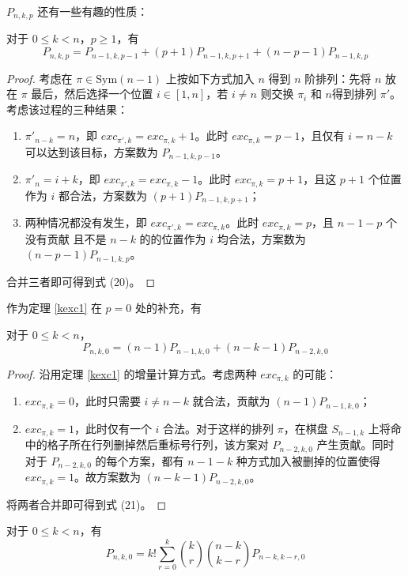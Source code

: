 \documentclass{noithesis}
\begin{document}
	$P_{n,k,p}$ 还有一些有趣的性质：
	\begin{theorem}\label{kexc1}
		对于 $0 \leq k < n$，$p \geq 1$，有
		\begin{equation}
		P_{n,k,p} = P_{n-1,k,p-1} + (p+1)P_{n-1,k,p+1}+(n-p-1)P_{n-1,k,p}
		\end{equation}
	\end{theorem}
	\begin{proof}
		考虑在 $\pi \in \mathrm{Sym}(n-1)$ 上按如下方式加入 $n$ 得到 $n$ 阶排列：先将 $n$ 放在 $\pi$ 最后，然后选择一个位置 $i \in [1,n]$，若 $i \neq n$ 则交换 $\pi_i$ 和 $n$得到排列 $\pi'$。考虑该过程的三种结果：
		\begin{enumerate}
			\item $\pi'_{n-k} = n$，即 $exc_{\pi',k} = exc_{\pi,k}+1$。此时 $exc_{\pi,k} = p-1$，且仅有 $i=n-k$ 可以达到该目标，方案数为 $P_{n-1,k,p-1}$。
			\item $\pi'_{n} = i+k$，即 $exc_{\pi',k} = exc_{\pi,k}-1$。此时 $exc_{\pi,k} = p+1$，且这 $p+1$ 个位置作为 $i$ 都合法，方案数为 $(p+1)P_{n-1,k,p+1}$；
			\item 两种情况都没有发生，即 $exc_{\pi',k} = exc_{\pi,k}$。此时 $exc_{\pi,k} = p$，且 $n-1-p$ 个没有贡献 且不是 $n-k$ 的的位置作为 $i$ 均合法，方案数为 $(n-p-1)P_{n-1,k,p}$。
		\end{enumerate}
		合并三者即可得到式 (20)。
	\end{proof}
	作为定理 \ref{kexc1} 在 $p=0$ 处的补充，有
	\begin{theorem}\label{kexc2}
		对于 $0 \leq k < n$，\begin{equation}
		P_{n,k,0} = (n-1)P_{n-1,k,0}+(n-k-1)P_{n-2,k,0}
		\end{equation}
	\end{theorem}
	\begin{proof}
		沿用定理 \ref{kexc1} 的增量计算方式。考虑两种 $exc_{\pi,k}$ 的可能：
		\begin{enumerate}
			\item $exc_{\pi,k} = 0$，此时只需要 $i \neq n-k$ 就合法，贡献为 $(n-1)P_{n-1,k,0}$；
			\item $exc_{\pi,k} = 1$，此时仅有一个 $i$ 合法。对于这样的排列 $\pi$，在棋盘 $S_{n-1,k}$ 上将命中的格子所在行列删掉然后重标号行列，该方案对 $P_{n-2,k,0}$ 产生贡献。同时对于 $P_{n-2,k,0}$ 的每个方案，都有 $n-1-k$ 种方式加入被删掉的位置使得 $exc_{\pi,k} = 1$。故方案数为 $(n-k-1)P_{n-2,k,0}$。
		\end{enumerate}
	将两者合并即可得到式 (21)。
	\end{proof}
	\begin{theorem}\label{kexc3}
	对于 $0 \leq k < n$，有\begin{equation}
	P_{n,k,0} = k!\sum_{r=0}^k \binom{k}{r} \binom{n-k}{k-r} P_{n-k,k-r,0}
	\end{equation}
	\end{theorem}
\end{document}
